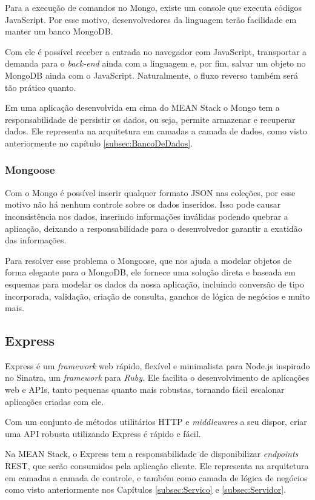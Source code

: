 \documentclass[
	12pt,				%
	openright,			%
	twoside,			%
	a4paper,			%
	english,			%
	brazil				%
	]{abntex2}
\begin{document}
Para a execução de comandos no Mongo, existe um console que executa códigos JavaScript. Por esse motivo, desenvolvedores da linguagem terão facilidade em manter um banco MongoDB.

Com ele é possível receber a entrada no navegador com JavaScript, transportar a demanda para o \textit{back-end} ainda com a linguagem e, por fim, salvar um objeto no MongoDB ainda com o JavaScript. Naturalmente, o fluxo reverso também será tão prático quanto.

Em uma aplicação desenvolvida em cima do MEAN Stack o Mongo tem a responsabilidade de persistir os dados, ou seja, permite armazenar e recuperar dados. Ele representa na arquitetura em camadas a camada de dados, como visto anteriormente no capítulo \ref{subsec:BancoDeDados}.

\subsubsection{Mongoose}

Com o Mongo é possível inserir qualquer formato JSON nas coleções, por esse motivo não há nenhum controle sobre os dados inseridos. Isso pode causar inconsistência nos dados, inserindo informações inválidas podendo quebrar a aplicação, deixando a responsabilidade para o desenvolvedor garantir a exatidão das informações.

Para resolver esse problema o Mongoose, que nos ajuda a modelar objetos de forma elegante para o MongoDB, ele fornece uma solução direta e baseada em esquemas para modelar os dados da nossa aplicação, incluindo conversão de tipo incorporada, validação, criação de consulta, ganchos de lógica de negócios e muito mais.

\subsection{Express}

Express é um \textit{framework} web rápido, flexível e minimalista para Node.js inspirado no Sinatra, um \textit{framework} para \textit{Ruby}. Ele facilita o desenvolvimento de aplicações web e APIs, tanto pequenas quanto mais robustas, tornando fácil escalonar aplicações criadas com ele.

Com um conjunto de métodos utilitários HTTP e \textit{middlewares} a seu dispor, criar uma API robusta utilizando Express é rápido e fácil.

Na MEAN Stack, o Express tem a responsabilidade de disponibilizar \textit{endpoints} REST, que serão consumidos pela aplicação cliente. Ele representa na arquitetura em camadas a camada de controle, e também como camada de lógica de negócios como visto anteriormente nos Capítulos \ref{subsec:Servico} e \ref{subsec:Servidor}.
\end{document}
